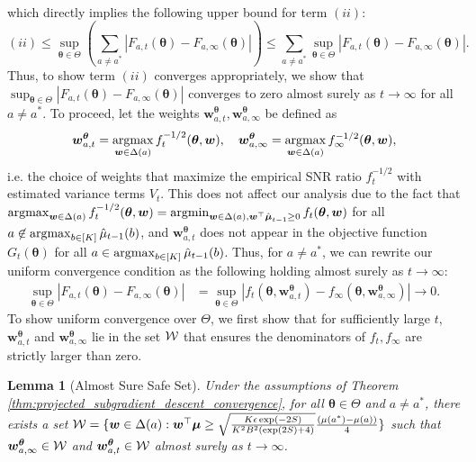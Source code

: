 \documentclass{article}
\newtheorem{lemma}{Lemma}
\begin{document}
\begin{appendices}
\begin{align}
\end{align}
which directly implies the following upper bound for term $(ii)$:
\begin{equation}
    (ii) \leq \sup_{\bm\theta \in \Theta}\left(\sum_{a \neq a^*}|F_{a,t}(\bm{\theta}) - F_{a,\infty}(\bm\theta)|\right) \leq \sum_{a \neq a^*}\sup_{\bm\theta \in \Theta}|F_{a,t}(\bm{\theta}) - F_{a,\infty}(\bm\theta)|.
\end{equation}
Thus, to show term $(ii)$ converges appropriately, we show that $\sup_{\bm\theta \in \Theta}|F_{a,t}(\bm{\theta}) - F_{a, \infty}(\bm{\theta})|$ converges to zero almost surely as $t \rightarrow \infty$ for all $a \neq a^*$.  To proceed, let the weights $\bm{w}_{a,t}^{\bm\theta}, \bm{w}_{a, \infty}^{\bm\theta}$ be defined as
$$ \bm{w}_{a,t}^{\bm\theta} = \argmax_{\bm{w}\in \Delta(a)} f^{-1/2}_t(\bm{\theta}, \bm{w}), \quad \bm{w}_{a, \infty}^{\bm\theta} = \argmax_{\bm{w} \in \Delta(a)} f_{\infty}^{-1/2}(\bm{\theta}, \bm{w}),$$
i.e. the choice of weights that maximize the empirical SNR ratio $f_t^{-1/2}$ with estimated variance terms $V_t$. This does not affect our analysis due to the fact that $\argmax_{\bm{w}\in \Delta(a)} f_t^{-1/2}(\bm{\theta}, \bm{w}) = \argmin_{\bm{w}\in \Delta(a), \bm{w}^\top \hat{\bm\mu}_{t-1}\geq 0} f_t(\bm\theta, \bm{w})$ for all $a \not\in \argmax_{b \in [K]}\hat\mu_{t-1}(b)$, and $\bm{w}_{a,t}^{\bm\theta}$ does not appear in the objective function $G_t(\bm{\theta})$ for all $a \in \argmax_{b \in [K]}\hat\mu_{t-1}(b)$. Thus, for $a \neq a^*$, we can rewrite our uniform convergence condition as the following holding almost surely as $t \rightarrow \infty$:
\begin{align}
    \sup_{\bm\theta \in \Theta}|F_{a,t}(\bm{\theta}) - F_{a,\infty}(\bm\theta)| &= \sup_{\bm\theta \in \Theta}\left| f_t(\bm{\theta}, \bm{w}_{a,t}^{\bm\theta}) -  f_\infty(\bm{\theta}, \bm{w}_{a,\infty}^{\bm\theta}) \right| \rightarrow 0. \label{eq:to_prove_2} 
\end{align}
To show uniform convergence over $\Theta$, we first show that for sufficiently large $t$, $\bm{w}_{a,t}^{\bm\theta}$ and $\bm{w}_{a,\infty}^{\bm\theta}$ lie in the set $\mathcal{W}$ that ensures the denominators of $f_t, f_\infty$ are strictly larger than zero. 
\begin{lemma}[Almost Sure Safe Set]\label{lem:safe_set}
    Under the assumptions of Theorem \ref{thm:projected_subgradient_descent_convergence}, for all $\bm\theta \in \Theta$ and $a \neq a^*$, there exists a set $\mathcal{W} = \{\boldsymbol{w} \in \Delta(a): \boldsymbol{w}^\top \boldsymbol{\mu} \geq \sqrt\frac{K\epsilon\exp(-2S)}{K^2B^2(\exp(2S)+4)}\frac{(\mu(a^*)-\mu(a))}{4} \}$ such that $\boldsymbol{w}_{a,\infty}^{\boldsymbol\theta} \in \mathcal{W}$ and $\boldsymbol{w}_{a,t}^{\boldsymbol\theta} \in \mathcal{W}$ almost surely as $t \rightarrow \infty$.  
\end{lemma}


\end{appendices}
\end{document}

